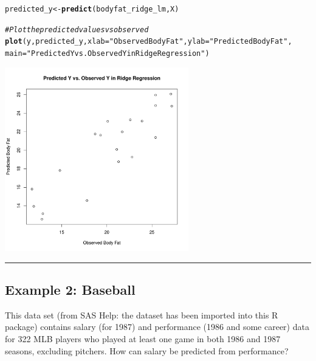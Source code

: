 \documentclass{article}\usepackage[]{graphicx}\usepackage[]{color}
\makeatletter
\newcommand{\hlstr}[1]{\textcolor[rgb]{0.192,0.494,0.8}{#1}}%
\newcommand{\hlcom}[1]{\textcolor[rgb]{0.678,0.584,0.686}{\textit{#1}}}%
\newcommand{\hlstd}[1]{\textcolor[rgb]{0.345,0.345,0.345}{#1}}%
\newcommand{\hlkwb}[1]{\textcolor[rgb]{0.69,0.353,0.396}{#1}}%
\newcommand{\hlkwc}[1]{\textcolor[rgb]{0.333,0.667,0.333}{#1}}%
\newcommand{\hlkwd}[1]{\textcolor[rgb]{0.737,0.353,0.396}{\textbf{#1}}}%
\newenvironment{kframe}{%
 \def\at@end@of@kframe{}%
 \ifinner\ifhmode%
  \def\at@end@of@kframe{\end{minipage}}%
  \begin{minipage}{\columnwidth}%
 \fi\fi%
 \def\FrameCommand##1{\hskip\@totalleftmargin \hskip-\fboxsep
 \colorbox{shadecolor}{##1}\hskip-\fboxsep
     \hskip-\linewidth \hskip-\@totalleftmargin \hskip\columnwidth}%
 \MakeFramed {\advance\hsize-\width
   \@totalleftmargin\z@ \linewidth\hsize
   \@setminipage}}%
 {\par\unskip\endMakeFramed%
 \at@end@of@kframe}
\newenvironment{knitrout}{}{} %
\makeatother
\begin{document}
\begin{knitrout}
\color{fgcolor}\begin{kframe}
\begin{alltt}
\hlstd{predicted_y} \hlkwb{<-} \hlkwd{predict}\hlstd{(bodyfat_ridge_lm, X)}

\hlcom{# Plot the predicted values vs observed}
\hlkwd{plot}\hlstd{(y, predicted_y,} \hlkwc{xlab} \hlstd{=} \hlstr{"Observed Body Fat"}\hlstd{,} \hlkwc{ylab} \hlstd{=} \hlstr{"Predicted Body Fat"}\hlstd{,}
     \hlkwc{main} \hlstd{=} \hlstr{"Predicted Y vs. Observed Y in Ridge Regression"}\hlstd{)}
\end{alltt}
\end{kframe}

{\centering \includegraphics[width=0.6\textwidth]{figure/unnamed-chunk-6-1} 

}



\end{knitrout}

\medskip
\hrule
\medskip

\subsection*{Example 2: Baseball}

This data set (from SAS Help: the dataset has been imported into this R package) contains salary (for 1987) and performance (1986 and some career) data for 322 MLB players who played at least one game in both 1986 and 1987 seasons, excluding pitchers. How can salary be predicted from performance?
\end{document}
